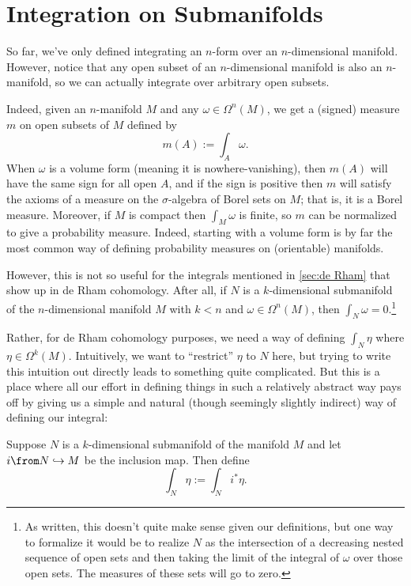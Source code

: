 
\section{Integration on Submanifolds}
\label{sec:integration on submanifolds}

So far, we've only defined integrating an $n$-form over an $n$-dimensional manifold. However, notice that any open subset of an $n$-dimensional manifold is also an $n$-manifold, so we can actually integrate over arbitrary open subsets.

Indeed, given an $n$-manifold $M$ and any $\omega \in \Omega^n(M)$, we get a (signed) measure $m$ on open subsets of $M$ defined by
\[
	m(A):=\int_A \omega.
\]
When $\omega $ is a volume form (meaning it is nowhere-vanishing), then $m(A)$ will have the same sign for all open $A$, and if the sign is positive then $m$ will satisfy the axioms of a measure on the $\sigma$-algebra of Borel sets on $M$; that is, it is a Borel measure. Moreover, if $M$ is compact then $\int_M \omega$ is finite, so $m$ can be normalized to give a probability measure. Indeed, starting with a volume form is by far the most common way of defining probability measures on (orientable) manifolds.

However, this is not so useful for the integrals mentioned in \cref{sec:de Rham} that show up in de Rham cohomology. After all, if $N$ is a $k$-dimensional submanifold of the $n$-dimensional manifold $M$  with $k < n$ and $\omega \in \Omega^n(M)$, then $\int_N \omega = 0$.\footnote{As written, this doesn't quite make sense given our definitions, but one way to formalize it would be to realize $N$ as the intersection of a decreasing nested sequence of open sets and then taking the limit of the integral of $\omega$ over those open sets. The measures of these sets will go to zero.}

Rather, for de Rham cohomology purposes, we need a way of defining $\int_N \eta$ where $\eta \in \Omega^k(M)$. Intuitively, we want to ``restrict'' $\eta$ to $N$ here, but trying to write this intuition out directly leads to something quite complicated. But this is a place where all our effort in defining things in such a relatively abstract way pays off by giving us a simple and natural (though seemingly slightly indirect) way of defining our integral:

\begin{definition}\label{def:integration on submanifold}
	Suppose $N$ is a $k$-dimensional submanifold of the manifold $M$ and let $i \from N \hookrightarrow M$ be the inclusion map. Then define
	\[
		\int_N \eta := \int_N i^\ast \eta.
	\]
\end{definition}

